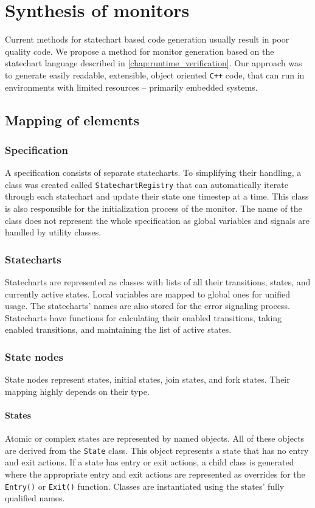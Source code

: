 \chapter{Synthesis of monitors}
\label{chap:synthesis_monitor}
Current methods for statechart based code generation usually result in poor quality code. We propose a method for monitor generation based on the statechart language described in \vref{chap:runtime_verification}. Our approach was to generate easily readable, extensible, object oriented \verb!C++! code, that can run in environments with limited resources -- primarily embedded systems.
\section{Mapping of elements}
  \subsection{Specification}
A specification consists of separate statecharts. To simplifying their handling, a class was created called \verb!StatechartRegistry! that can automatically iterate through each statechart and update their state one timestep at a time. This class is also responsible for the initialization process of the monitor. The name of the class does not represent the whole specification as global variables and signals are handled by utility classes.
  \subsection{Statecharts}
Statecharts are represented as classes with lists of all their transitions, states, and currently active states. Local variables are mapped to global ones for unified usage. The statecharts' names are also stored for the error signaling process. Statecharts have functions for calculating their enabled transitions, taking enabled transitions, and maintaining the list of active states.
  \subsection{State nodes}
State nodes represent states, initial states, join states, and fork states. Their mapping highly depends on their type.
    \subsubsection{States}
Atomic or complex states are represented by named objects. All of these objects are derived from the \verb!State! class. This object represents a state that has no entry and exit actions. If a state has entry or exit actions, a child class is generated where the appropriate entry and exit actions are represented as overrides for the \verb!Entry()! or \verb!Exit()! function. Classes are instantiated using the states' fully qualified names.

